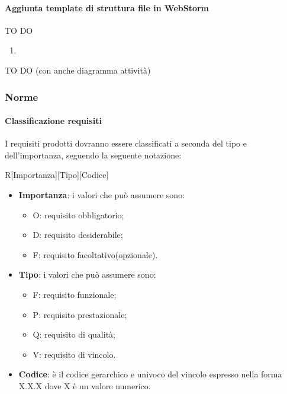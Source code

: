 			\paragraph{Aggiunta template di struttura file in WebStorm} %
			\label{par:aggiunta_template_di_struttura_file_in_webstorm}
			TO DO \newline
				\begin{enumerate}
					\item 
				\end{enumerate}
			TO DO (con anche diagramma attività)

		\subsubsection{Norme}
			\paragraph{Classificazione requisiti}
I requisiti prodotti dovranno essere classificati a seconda del tipo e dell'importanza, seguendo la seguente notazione:
				\begin{center}
					R[Importanza][Tipo][Codice]
				\end{center}
			\noindent
				\begin{itemize}
					\item \textbf{Importanza}: i valori che può assumere sono:
						\begin{itemize}
							\item O: requisito obbligatorio;
							\item D: requisito desiderabile;
							\item F: requisito facoltativo(opzionale).
						\end{itemize}
					\item \textbf{Tipo}: i valori che può assumere sono:
						\begin{itemize}
							\item F: requisito funzionale;
							\item P: requisito prestazionale;
							\item Q: requisito di qualità;
							\item V: requisito di vincolo.
						\end{itemize}
					\item \textbf{Codice}: è il codice gerarchico e univoco del vincolo espresso nella forma X.X.X dove X è un valore numerico.
				\end{itemize}
